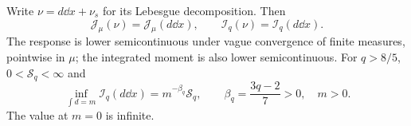 \begin{lemma}
\label{lem:measure-relaxation}
Write $\nu=d\dd x+\nu_s$ for its Lebesgue decomposition. Then
\begin{equation}\label{eq:singular-useless}
 \mathscr J_\mu(\nu)=\mathscr J_\mu(d\dd x),\qquad
 \mathscr I_q(\nu)=\mathscr I_q(d\dd x).
\end{equation}
The response is lower semicontinuous under vague convergence of
finite measures, pointwise in $\mu$; the integrated moment is also
lower semicontinuous. For $q>8/5$, $0<\mathcal S_q<\infty$ and
\begin{equation}\label{eq:fold-mass-scaling}
 \inf_{\int d=m}\mathscr I_q(d\dd x)
       =m^{-\beta_q}\mathcal S_q,\qquad
 \beta_q=\frac{3q-2}{7}>0,\quad m>0.
\end{equation}
The value at $m=0$ is infinite.
\end{lemma}
